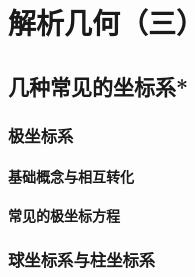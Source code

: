 
\chapter{解析几何（三）}
\clearpage
\section{几种常见的坐标系*}
\subsection{极坐标系}
\subsubsection{基础概念与相互转化}
\clearpage
\subsubsection{常见的极坐标方程}
\clearpage
\subsection{球坐标系与柱坐标系}
\clearpage

